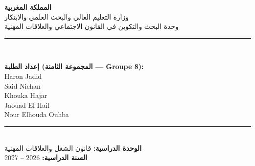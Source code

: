 \begin{titlepage}
\thispagestyle{empty}
\pagecolor{maincolor}
\color{white}

\vspace*{0.8cm}
{\centering

{\large\bfseries المملكة المغربية}\\[0.3cm]
{\large وزارة التعليم العالي والبحث العلمي والابتكار}\\[0.2cm]
{\normalsize وحدة البحث والتكوين في القانون الاجتماعي والعلاقات المهنية}\\[0.4cm]
\rule{0.9\textwidth}{0.6pt}\\[1cm]

\setlength{\fboxsep}{18pt}

\vspace{1.5cm}

{\large\bfseries إعداد الطلبة (المجموعة الثامنة --- \textenglish{Groupe 8}):}\\[0.4cm]
{\large \textenglish{Haron Jadid}}\\[0.15cm]
{\large \textenglish{Said Nichan}}\\[0.15cm]
{\large \textenglish{Khouka Hajar}}\\[0.15cm]
{\large \textenglish{Jaouad El Hail}}\\[0.15cm]
{\large \textenglish{Nour Elhouda Ouhba}}\\[0.9cm]

\rule{0.9\textwidth}{0.5pt}\\[0.6cm]

{\normalsize\bfseries الوحدة الدراسية:}
{\normalsize قانون الشغل والعلاقات المهنية}\\[0.3cm]
{\normalsize\bfseries السنة الدراسية:}
{\normalsize \textenglish{2026 -- 2027}}

\vfill

} %
\end{titlepage}

\pagecolor{white}
\color{black}
